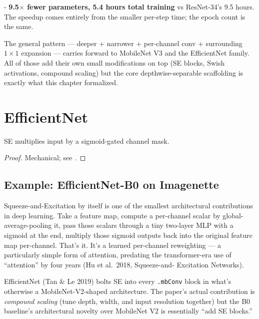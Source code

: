- \textbf{9.5$\times$ fewer parameters, 5.4 hours total
  training} vs ResNet-34's 9.5 hours. The speedup comes entirely
  from the smaller per-step time; the epoch count is the same.

The general pattern ---  deeper + narrower + per-channel conv +
surrounding $1 \times 1$ expansion --- carries forward to MobileNet
V3 and the EfficientNet family. All of those add their own small
modifications on top (SE blocks, Swish activations, compound scaling)
but the core depthwise-separable scaffolding is exactly what this
chapter formalized.

\chapter{EfficientNet}
\label{chap:se}

\begin{theorem}
  \label{thm:seBlock_has_vjp}
  \leanok
  SE multiplies input by a sigmoid-gated channel mask.
\end{theorem}

\begin{proof}
\leanok
Mechanical; see .
\end{proof}

\section{Example: EfficientNet-B0 on Imagenette}
\label{sec:se_efficientnet_example}

Squeeze-and-Excitation by itself is one of the smallest architectural
contributions in deep learning. Take a feature map, compute a
per-channel scalar by global-average-pooling it, pass those scalars
through a tiny two-layer MLP with a sigmoid at the end, multiply
those sigmoid outputs back into the original feature map
per-channel. That's it. It's a learned per-channel reweighting --- a
particularly simple form of attention, predating the transformer-era
use of ``attention'' by four years (Hu et al.\ 2018, Squeeze-and-
Excitation Networks).

EfficientNet (Tan \& Le 2019) bolts SE into every
\texttt{.mbConv} block in what's otherwise a MobileNet-V2-shaped
architecture. The paper's actual contribution is \emph{compound
scaling} (tune depth, width, and input resolution together) but
the B0 baseline's architectural novelty over MobileNet V2 is
essentially ``add SE blocks.''

